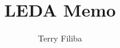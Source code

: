 \documentclass[fleqn, onecolumn]{article}
\begin{document}
\title{LEDA Memo}
\date{}
\author{Terry Filiba}
\maketitle





\end{document}
